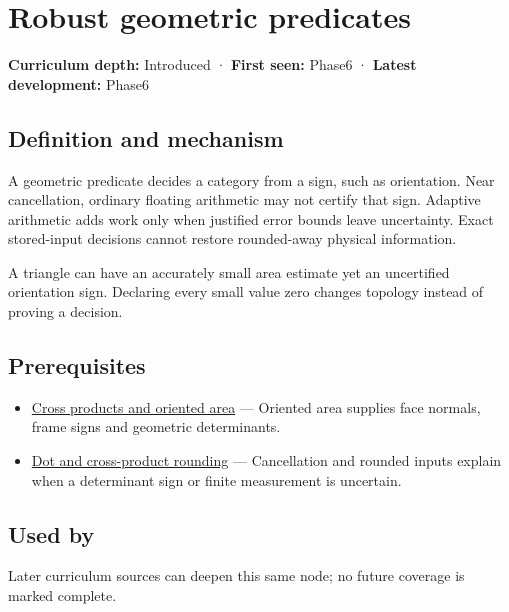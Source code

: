 \hypertarget{appendix-341296fb3f64}{}\label{referencestart:appendix-341296fb3f64}
\section{Robust geometric predicates}\label{appendix-341296fb3f64-robust-geometric-predicates}

\textbf{Curriculum depth:} Introduced · \textbf{First seen:} Phase6 · \textbf{Latest development:} Phase6

\subsection{Definition and mechanism}\label{appendix-341296fb3f64-definition-and-mechanism}

A geometric predicate decides a category from a sign, such as orientation. Near cancellation, ordinary floating arithmetic may not certify that sign. Adaptive arithmetic adds work only when justified error bounds leave uncertainty. Exact stored-input decisions cannot restore rounded-away physical information.

A triangle can have an accurately small area estimate yet an uncertified orientation sign. Declaring every small value zero changes topology instead of proving a decision.

\subsection{Prerequisites}\label{appendix-341296fb3f64-prerequisites}

\begin{itemize}
\tightlist
\item
  \hyperref[appendix-2391db8052b1]{Cross products and oriented area} --- Oriented area supplies face normals, frame signs and geometric determinants.
\item
  \hyperref[appendix-5aef4f13483a]{Dot and cross-product rounding} --- Cancellation and rounded inputs explain when a determinant sign or finite measurement is uncertain.
\end{itemize}

\subsection{Used by}\label{appendix-341296fb3f64-used-by}

Later curriculum sources can deepen this same node; no future coverage is marked complete.


